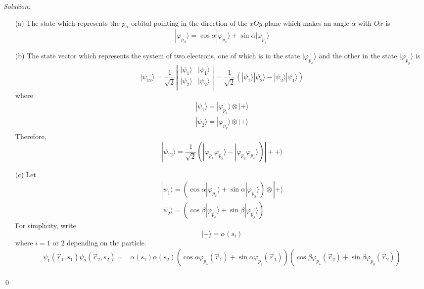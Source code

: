 \documentclass[10pt,a4paper]{article}
\newenvironment{sol}
    {\emph{Solution:}
    }
    {
    \qed
    }
\begin{document}
\begin{sol}
\begin{itemize}
\item[(a)] The state which represents the $p_{\alpha}$ orbital pointing in the direction of the $xOy$ plane which makes an angle $\alpha$ with $Ox$ is
\begin{equation}
|\varphi_{p_{\alpha}}\rangle=\cos\alpha|\varphi_{p_{x}}\rangle+\sin\alpha|\varphi_{p_y}\rangle
\end{equation}
\item[(b)] The state vector which represents the system of two electrons, one of which is in the state $|\varphi_{p_x}\rangle$ and the other in the state $|\varphi_{p_y}\rangle$ is
\begin{equation}
|\psi_{12}\rangle=\frac{1}{\sqrt{2}}\left|\begin{array}{cc}
|\psi_1\rangle&|\psi_1\rangle\\
|\psi_2\rangle&|\psi_2\rangle\\
\end{array}\right|=\frac{1}{\sqrt{2}}(|\psi_1\rangle|\psi_2\rangle-|\psi_2\rangle|\psi_1\rangle)
\end{equation}
where
\begin{gather}
|\psi_1\rangle=|\varphi_{p_x}\rangle\otimes|+\rangle\\
|\psi_2\rangle=|\varphi_{p_y}\rangle\otimes|+\rangle
\end{gather}
Therefore,
\begin{equation}
|\psi_{12}\rangle=\frac{1}{\sqrt{2}}(|\varphi_{p_x}\varphi_{p_y}\rangle-|\varphi_{p_y}\varphi_{p_x}\rangle)|++\rangle
\end{equation}
\item[(c)] Let
\begin{gather}
|\psi_1\rangle=(\cos\alpha|\varphi_{p_x}\rangle+\sin\alpha|\varphi_{p_y}\rangle)\otimes|+\rangle\\
|\psi_2\rangle=(\cos\beta|\varphi_{p_x}\rangle+\sin\beta|\varphi_{p_y}\rangle)
\end{gather}
For simplicity, write
\begin{equation}
|+\rangle=\alpha(s_i)
\end{equation}
where $i=1$ or $2$ depending on the particle.
\begin{align}
\nonumber\psi_1(\vec{r}_1,s_1)\psi_2(\vec{r}_2,s_2)=&\alpha(s_1)\alpha(s_2)(\cos\alpha\varphi_{p_x}(\vec{r}_1)+\sin\alpha\varphi_{p_y}(\vec{r}_1))(\cos\beta\varphi_{p_x}(\vec{r}_2)+\sin\beta\varphi_{p_y}(\vec{r}_2))\\

\end{align}
\end{itemize}
\end{sol}
\end{document}
